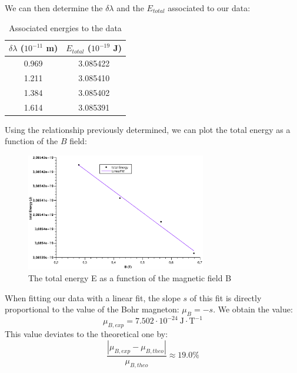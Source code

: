 \documentclass{scrartcl}
\begin{document}
We can then determine the $\delta \lambda$ and the $E_{total}$ associated to our data:
\begin{table}[H]
    \centering
    \begin{tabular}{c|c}
        $\delta \lambda$ ($10^{-11}$ m) & $E_{total}$ ($10^{-19}$ J) \\ \hline
        0.969 & 3.085422 \\
        1.211 & 3.085410 \\
        1.384 & 3.085402 \\
        1.614 & 3.085391
    \end{tabular}
    \caption{Associated energies to the data}
    \label{tab:energies}
\end{table}

Using the relationship previously determined, we can plot the total energy as a function of the $B$ field:
\begin{figure}[H]
    \centering
    \includegraphics[width=0.7\textwidth]{E_function_B.eps}
    \caption{The total energy E as a function of the magnetic field B}
    \label{fig:E(B)}
\end{figure}

When fitting our data with a linear fit, the slope $s$ of this fit is directly proportional to the value of the Bohr magneton: $\mu_B = -s$. We obtain the value: \begin{equation} \mu_{B,exp} = 7.502 \cdot 10^{-24} \ \text{J} \cdot \text{T}^{-1} \end{equation} This value deviates to the theoretical one by: \begin{equation} \frac{|\mu_{B,exp}-\mu_{B,theo}|}{\mu_{B,theo}} \approx 19.0 \% \end{equation}
\end{document}
